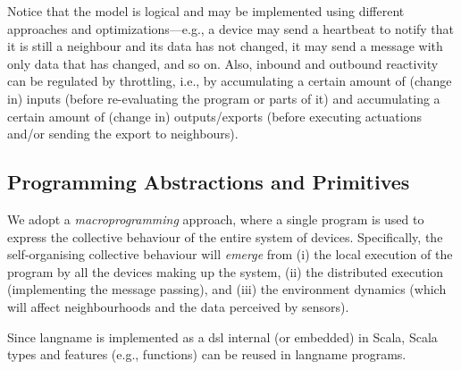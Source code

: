 Notice that the model is logical 
 and may be implemented using different approaches and optimizations---e.g., a device may send a heartbeat to notify that it is still a neighbour and its data has not changed,
 it may send a message with only data that has changed, and so on.
%
Also, inbound and outbound reactivity can be regulated by throttling, i.e.,
 by accumulating a certain amount of (change in) inputs (before re-evaluating the program or parts of it)
 and  accumulating a certain amount of (change in) outputs/exports
 (before executing actuations and/or sending the export to neighbours).
 
%

\subsection{Programming Abstractions and Primitives}
\label{acsos2023-frp:programming-constructs}


We adopt a \emph{macroprogramming} approach\cite{casadei2023macro},
 where a single program
 is used to express the collective behaviour
 of the entire system of devices.
%
Specifically,
 the self-organising collective behaviour
 will \emph{emerge}
 from 
 (i) the local execution of the program
 by all the devices making up the system, 
 (ii) the distributed execution (implementing the message passing),
 and 
 (iii) the environment dynamics (which will affect neighbourhoods and the data perceived by sensors).

%

Since \ac{langname} is implemented as a \ac{dsl} internal (or embedded) in Scala,
 Scala types and features (e.g., functions)
 can be reused in \ac{langname} programs.

